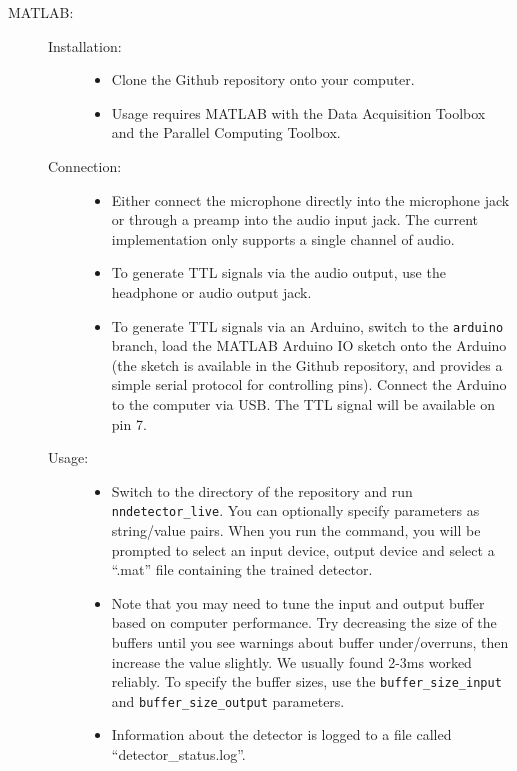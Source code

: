 \documentclass[10pt,letterpaper]{article}
\providecommand{\DIFaddtex}[1]{{\protect\color{blue}\uwave{#1}}} %
\providecommand{\DIFaddbegin}{} %
\providecommand{\DIFaddend}{} %
\providecommand{\DIFadd}[1]{\texorpdfstring{\DIFaddtex{#1}}{#1}} %
\begin{document}
\begin{description}
\begin{description}
  \DIFaddend \item[MATLAB:]\DIFaddbegin \hfill
    \DIFaddend  \begin{description} 
    \item[Installation:]\hfill
       \begin{itemize} 
      \item Clone the Github repository onto your computer.
      \item Usage requires MATLAB with the Data Acquisition Toolbox and the 
      Parallel Computing Toolbox.
       \end{itemize} 
    \item[Connection:]\hfill
       \begin{itemize} 
      \item Either connect the microphone directly into the microphone jack or through a 
      preamp into the audio input jack. The current implementation only supports a single 
      channel of audio.
      \item To generate TTL signals via the audio output, use the headphone or audio output
      jack.
      \item To generate TTL signals via an Arduino, switch to the {\tt arduino} branch, 
      load the MATLAB Arduino IO sketch onto the Arduino (the sketch is available in the 
      Github repository, and provides a simple serial protocol for controlling pins). 
      Connect the Arduino to the computer via USB. The TTL signal will be available on
      pin 7.
       \end{itemize} 
    \item[Usage:]\hfill
       \begin{itemize} 
      \item Switch to the directory of the repository and run {\tt nndetector\_live}. You
      can optionally specify parameters as string/value pairs. When you run the command,
      you will be prompted to select an input device, output device and select a ``.mat''
      file containing the trained detector.
      \item Note that you may need to tune the input and output buffer based on computer 
      performance. Try decreasing the size of the buffers until you see warnings about buffer
      under/overruns, then increase the value slightly. We usually found 2-3ms worked reliably.
      To specify the buffer sizes, use the {\tt buffer\_size\_input} and 
      {\tt buffer\_size\_output} parameters.
      \item Information about the detector is logged to a file called ``detector\_status.log''.
       \end{itemize} 
     \end{description} 
    \DIFaddbegin 


\end{description}
\end{description}
\end{document}
